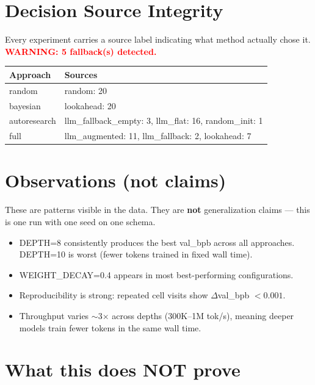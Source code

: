 \documentclass[10pt,a4paper,twocolumn]{article}
\begin{document}
    \section{Decision Source Integrity}

    Every experiment carries a source label indicating what method actually chose it.
    \textcolor{red}{\textbf{WARNING: 5 fallback(s) detected.}}

    \begin{table}[h]
    \centering
    \small
    \begin{tabular}{ll}
    \toprule
    Approach & Sources \\
    \midrule
        random & random: 20 \\
    bayesian & lookahead: 20 \\
    autoresearch & llm\_fallback\_empty: 3, llm\_flat: 16, random\_init: 1 \\
    full & llm\_augmented: 11, llm\_fallback: 2, lookahead: 7 \\
    \bottomrule
    \end{tabular}
    \end{table}

    \section{Observations (not claims)}

    These are patterns visible in the data. They are \textbf{not} generalization claims ---
    this is one run with one seed on one schema.

    \begin{itemize}
    \item DEPTH=8 consistently produces the best val\_bpb across all approaches.
          DEPTH=10 is worst (fewer tokens trained in fixed wall time).
    \item WEIGHT\_DECAY=0.4 appears in most best-performing configurations.
    \item Reproducibility is strong: repeated cell visits show $\Delta$val\_bpb $< 0.001$.
    \item Throughput varies $\sim$3$\times$ across depths (300K--1M tok/s), meaning
          deeper models train fewer tokens in the same wall time.
    \end{itemize}

    \section{What this does NOT prove}
\end{document}
